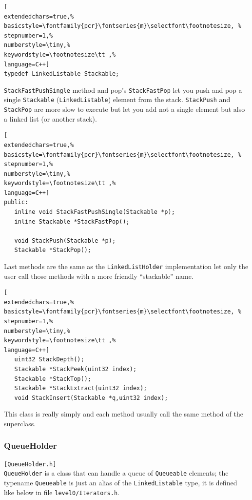 \begin{lstlisting}[
extendedchars=true,%
basicstyle=\fontfamily{pcr}\fontseries{m}\selectfont\footnotesize, %
stepnumber=1,%
numberstyle=\tiny,%
keywordstyle=\footnotesize\tt ,%
language=C++]
typedef LinkedListable Stackable;
\end{lstlisting}

\texttt{StackFastPushSingle} method and pop's \texttt{StackFastPop} let you push and pop a single \texttt{Stackable} (\texttt{LinkedListable}) element from the stack. \texttt{StackPush} and \texttt{StackPop} are more slow to execute but let you add not a single element but also a linked list (or another stack).

\begin{lstlisting}[
extendedchars=true,%
basicstyle=\fontfamily{pcr}\fontseries{m}\selectfont\footnotesize, %
stepnumber=1,%
numberstyle=\tiny,%
keywordstyle=\footnotesize\tt ,%
language=C++]
public:
   inline void StackFastPushSingle(Stackable *p);
   inline Stackable *StackFastPop();

   void StackPush(Stackable *p);
   Stackable *StackPop();
\end{lstlisting}

Last methods are the same as the \texttt{LinkedListHolder} implementation let only the user call those methods with a more friendly ``stackable'' name.

\begin{lstlisting}[
extendedchars=true,%
basicstyle=\fontfamily{pcr}\fontseries{m}\selectfont\footnotesize, %
stepnumber=1,%
numberstyle=\tiny,%
keywordstyle=\footnotesize\tt ,%
language=C++]
   uint32 StackDepth();
   Stackable *StackPeek(uint32 index);
   Stackable *StackTop();
   Stackable *StackExtract(uint32 index);
   void StackInsert(Stackable *q,uint32 index);
\end{lstlisting}

This class is really simply and each method usually call the same method of the superclass.



\subsubsection{QueueHolder}
\texttt{[QueueHolder.h]}\\
\texttt{QueueHolder} is a class that can handle a queue of \texttt{Queueable} elements; the typename \texttt{Queueable} is just an alias of the \texttt{LinkedListable} type, it is defined like below in file \texttt{level0/Iterators.h}.

